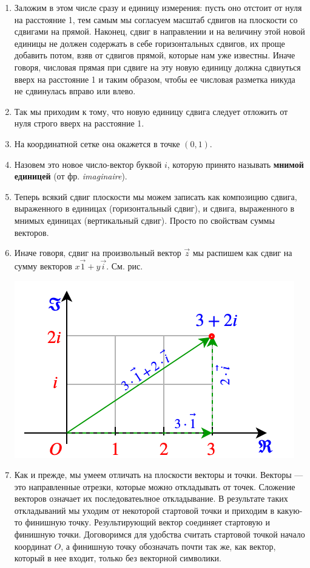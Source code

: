 \begin{enumerate}
\item Заложим в этом числе сразу и единицу измерения: пусть оно отстоит от нуля на расстояние 1, тем самым мы согласуем масштаб сдвигов на плоскости со сдвигами на прямой. Наконец, сдвиг в направлении и на величину этой новой единицы не должен содержать в себе горизонтальных сдвигов, их проще добавить потом, взяв от сдвигов прямой, которые нам уже известны. Иначе говоря, числовая прямая при сдвиге на эту новую единицу должна сдвиуться вверх на расстояние 1 и таким образом, чтобы ее числовая разметка никуда не сдвинулась вправо или влево.
\item Так мы приходим к тому, что новую единицу сдвига следует отложить от нуля строго вверх на расстояние 1.
\item На координатной сетке она окажется в точке $(0,1)$.
\item Назовем это новое число-вектор буквой $i$,  которую принято называть \textbf{мнимой единицей} (от фр. \textit{imaginaire}).
\item Теперь всякий сдвиг плоскости мы можем записать как композицию сдвига, выраженного в единицах (горизонтальный сдвиг), и сдвига, выраженного в мнимых единицах (вертикальный сдвиг). Просто по свойствам суммы векторов.
\item Иначе говоря, сдвиг на произвольный вектор $\vec z$ мы распишем как сдвиг на сумму векторов $x\vec 1+y\vec i$. См. рис.
\begin{center}
\includegraphics[scale=0.5]{complex.png}
\end{center}
\item Как и прежде, мы умеем отличать на плоскости векторы и точки. Векторы --- это направленные отрезки, которые можно откладывать от точек. Сложение векторов означает их последоватеьлное откладывание. В результате таких откладываний мы уходим от некоторой стартовой точки и приходим в какую-то финишную точку. Результирующий вектор соединяет стартовую и финишную точки. Договоримся для удобства считать стартовой точкой начало координат $O$, а финишную точку обозначать почти так же, как вектор, который в нее входит, только без векторной символики.

\end{enumerate}

